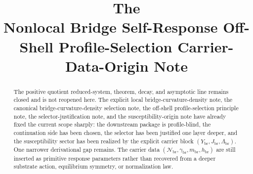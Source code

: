 \documentclass[11pt]{article}
\title{\textbf{The \TheoryName{}}\\[0.4em]
\large Nonlocal Bridge Self-Response Off-Shell Profile-Selection Carrier-Data-Origin Note}
\author{}
\date{}
\newcommand{\RespCarrier}{Y_{\mathrm{br}}}
\newcommand{\RespFlux}{J_{\mathrm{br}}}
\newcommand{\RespCompat}{\Lambda_{\mathrm{br}}}
\newcommand{\RespNorm}{\mathcal N_{\mathrm{br}}}
\newcommand{\RespFluxCoeff}{\gamma_{\mathrm{br}}}
\newcommand{\RespGap}{m_{\mathrm{br}}}
\newcommand{\RespBias}{h_{\mathrm{br}}}
\begin{document}
\maketitle

\begin{abstract}
The positive quotient reduced-system, theorem, decay, and asymptotic line remains closed and is not reopened here. The explicit local bridge-curvature-density note, the canonical bridge-curvature-density selection note, the off-shell profile-selection principle note, the selector-justification note, and the susceptibility-origin note have already fixed the current scope sharply: the downstream package is profile-blind, the continuation side has been chosen, the selector has been justified one layer deeper, and the susceptibility sector has been realized by the explicit carrier block \((\RespCarrier,\RespFlux,\RespCompat)\). One narrower derivational gap remains. The carrier data \((\RespNorm,\RespFluxCoeff,\RespGap,\RespBias)\) are still inserted as primitive response parameters rather than recovered from a deeper substrate action, equilibrium symmetry, or normalization law.


\end{abstract}
\end{document}
